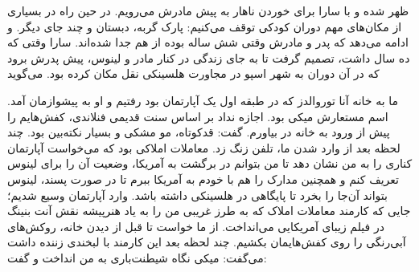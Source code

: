 \begin{journal}
ظهر شده و با سارا برای خوردن ناهار به پیش مادرش می‌رویم. در حین راه در
بسیاری از مکان‌های مهم دوران کودکی توقف می‌کنیم: پارک گربه، دبستان و چند
جای دیگر.  و ادامه می‌دهد که  پدر و مادرش
وقتی شش ساله بوده از هم جدا شده‌اند.  سارا وقتی که ده سال داشت،
تصمیم گرفت تا به جای زندگی در کنار مادر و لینوس، پیش پدرش برود که در
آن دوران به شهر اسپو در مجاورت هلسینکی نقل مکان کرده
بود. می‌گوید 

ما به خانه آنا توروالدز که در طبقه اول یک آپارتمان بود رفتیم و او به
پیشوازمان آمد. اسم مستعارش میکی بود. اجازه نداد بر اساس سنت قدیمی
فنلاندی، کفش‌هایم را پیش از ورود به خانه در بیاورم. گفت:   قدکوتاه، مو مشکی و بسیار نکته‌بین بود. چند لحظه بعد از وارد
شدن ما، تلفن زنگ زد. معاملات املاکی بود که می‌خواست آپارتمان کناری را
به من نشان دهد تا من بتوانم در برگشت به آمریکا، وضعیت آن را برای لینوس
تعریف کنم و همچنین مدارک را هم با خودم به آمریکا ببرم تا در صورت پسند،
لینوس بتواند آن‌جا را بخرد تا پایگاهی در هلسینکی داشته باشد. وارد
آپارتمان وسیع شدیم؛ جایی که کارمند معاملات املاک که به طرز غریبی من را
به یاد هنرپیشه نقش آنت بنینگ در فیلم زیبای
آمریکایی می‌انداخت. از ما خواست تا قبل از دیدن خانه، روکش‌های آبی‌رنگی را
روی کفش‌هایمان بکشیم. چند لحظه بعد این کارمند با لبخندی زننده داشت
می‌گفت: 
میکی نگاه شیطنت‌باری به من انداخت و گفت: 


\end{journal}
